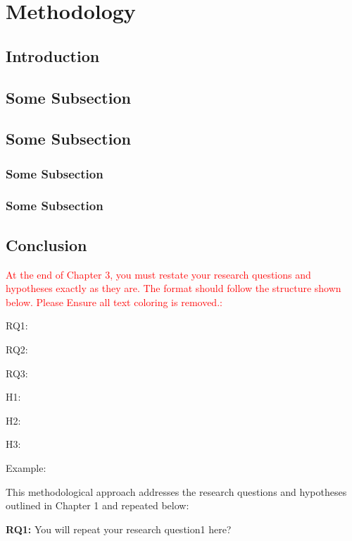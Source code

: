 \chapter{Methodology}
\section{Introduction}
\lipsum[1]


\section{Some Subsection}
\lipsum[1]



\section{Some Subsection}
\lipsum[1]

\subsection{Some Subsection}
\lipsum[1]



\subsection{Some Subsection}
\lipsum[1]

 
\section{Conclusion}
\lipsum[1]

 
\textcolor{red}{At the end of Chapter 3, you must restate your research questions and hypotheses exactly as they are. The format should follow the structure shown below. Please Ensure all text coloring is removed.:}\par
RQ1:\par
RQ2:\par
RQ3:\par
H1:\par
H2:\par
H3:\par
 
 

Example:

This methodological approach addresses the research questions and hypotheses outlined in Chapter 1 and repeated below:


\textbf{RQ1:} You will repeat your research question1 here?\par

